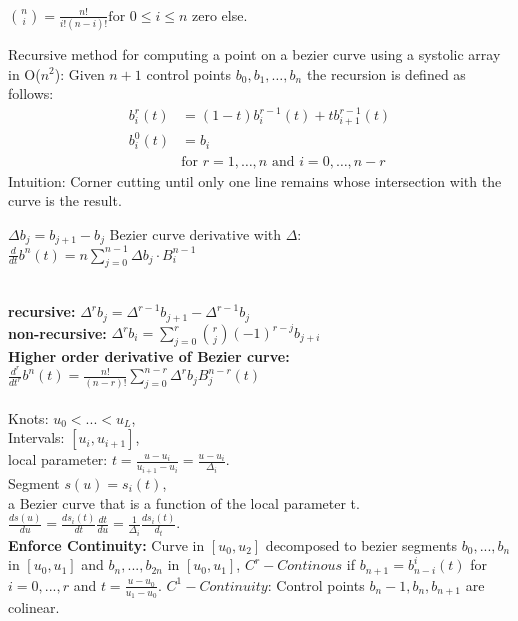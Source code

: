 \\
$\binom{n}{i} = \frac{n!}{i!(n-i)!} \text{for } 0 \leq i \leq n$ zero else.

Recursive method for computing a point on a bezier curve using a systolic array in O($n^2$):
Given \( n+1 \) control points \( b_0, b_1, \ldots, b_n \) the recursion is defined as follows:
\begin{align*}
b_i^r(t) &= (1 - t) b_i^{r-1}(t) + t b_{i+1}^{r-1}(t) \\
b_i^0(t) &= b_i \\
&\text{for } r = 1, \ldots, n \text{ and } i = 0, \ldots, n-r
\end{align*}
Intuition: Corner cutting until only one line remains whose intersection with the curve is the result. 

 $\Delta b_j = b_{j+1} - b_j$
Bezier curve derivative with $\Delta$: \\ $\frac{d}{dt}b^n(t) = n\sum_{j=0}^{n-1} \Delta b_j \cdot B_i^{n-1}$


 \\
\textbf{recursive:} $\Delta^r b_j = \Delta^{r-1}b_{j+1} - \Delta^{r-1}b_j$\\
\textbf{non-recursive:} $\Delta^r b_i = \sum_{j=0}^r \binom{r}{j} (-1)^{r-j} b_{j+i}$\\
\textbf{Higher order derivative of Bezier curve:} $\frac{d^r}{dt^r} b^n(t) = \frac{n!}{(n-r)!} \sum_{j=0}^{n-r} \Delta^r b_j B_j^{n-r}(t)$\\
\\
Knots: $u_0 < ... <u_L$, \\
Intervals: $[u_i, u_{i+1}]$, \\
local parameter: $t = \frac{u - u_i}{u_{i+1} - u_i} = \frac{u - u_i}{\Delta_i}$. \\
Segment $s(u) = s_i(t)$, \\
a Bezier curve that is a function of the local parameter t.
$\frac{ds(u)}{du} = \frac{ds_i(t)}{dt}\frac{dt}{du} = \frac{1}{\Delta_i}\frac{ds_i(t)}{d_t}$. \\
\textbf{Enforce Continuity:} Curve in $[u_0, u_2]$ decomposed to bezier segments $b_0, ..., b_n$ in $[u_0, u_1]$ and $b_n, ..., b_{2n}$ in $[u_0, u_1]$, $C^r-Continous$ if $b_{n+1} = b_{n-i}^i(t)$ for $i = 0,...,r$ and $t = \frac{u - u_0}{u_1 - u_0 }$. $C^1-Continuity$: Control points $b_n-1, b_n, b_{n+1}$ are colinear. 

